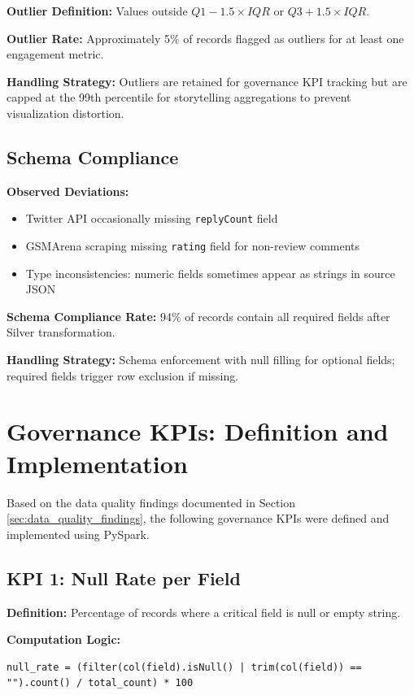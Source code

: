 \documentclass[12pt]{article}
\begin{document}
\textbf{Outlier Definition:} Values outside \(Q1 - 1.5 \times IQR\) or \(Q3 + 1.5 \times IQR\).

\textbf{Outlier Rate:} Approximately 5\% of records flagged as outliers for at least one engagement metric.

\textbf{Handling Strategy:} Outliers are retained for governance KPI tracking but are capped at the 99th percentile for storytelling aggregations to prevent visualization distortion.

\subsection{Schema Compliance}

\textbf{Observed Deviations:}
\begin{itemize}
    \item Twitter API occasionally missing \texttt{replyCount} field
    \item GSMArena scraping missing \texttt{rating} field for non-review comments
    \item Type inconsistencies: numeric fields sometimes appear as strings in source JSON
\end{itemize}

\textbf{Schema Compliance Rate:} 94\% of records contain all required fields after Silver transformation.

\textbf{Handling Strategy:} Schema enforcement with null filling for optional fields; required fields trigger row exclusion if missing.

\newpage

\section{Governance KPIs: Definition and Implementation}
\label{sec:governance_kpis}

Based on the data quality findings documented in Section \ref{sec:data_quality_findings}, the following governance KPIs were defined and implemented using PySpark.

\subsection{KPI 1: Null Rate per Field}

\textbf{Definition:} Percentage of records where a critical field is null or empty string.

\textbf{Computation Logic:}
\begin{lstlisting}
null_rate = (filter(col(field).isNull() | trim(col(field)) == "").count() / total_count) * 100
\end{lstlisting}
\end{document}
